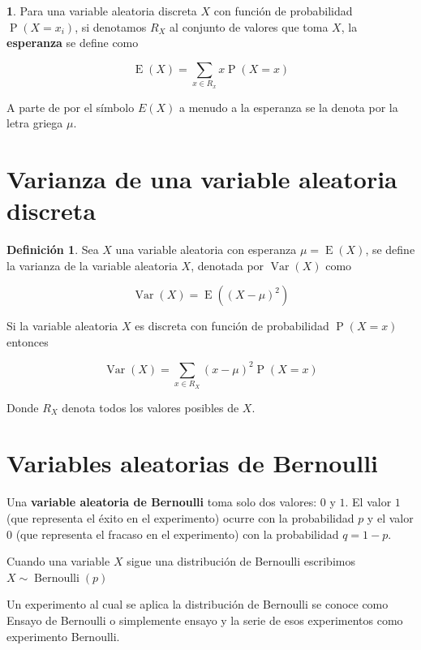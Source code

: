 \documentclass[]{book}
\theoremstyle{plain}
\theoremstyle{definition}
\newtheorem{definition}[theorem]{Definición}
\theoremstyle{definition} %
\newcommand{\thistheoremname}{}
\newtheorem{genericthm}[theorem]{\thistheoremname}
\newenvironment{customdef}[1]
  {\renewcommand{\thistheoremname}{#1}%
   \begin{genericthm}}
  {\end{genericthm}}
\begin{document}
\begin{customdef}{Definición intuitiva de esperanza}
Para una variable aleatoria discreta \(X\) con función de probabilidad
\(\displaystyle \operatorname {P} (X=x_{i})\), si denotamos $R_X$ al conjunto de valores que toma $X$,
 la \textbf{esperanza} se define como

\[\displaystyle \operatorname {E} (X)=\sum _{x \in R_x}x\operatorname {P} (X=x)\]

A parte de por el símbolo $E(X)$ a menudo a la esperanza se la denota por la letra griega $\mu$.

\end{customdef}


\section{Varianza de una variable aleatoria
discreta}
\begin{definition}
  Sea \(X\) una variable aleatoria con esperanza
\(\displaystyle \mu =\operatorname {E} (X)\), se define la varianza de
la variable aleatoria \(X\), denotada por
\(\displaystyle \operatorname {Var} (X)\) como

\[\displaystyle \operatorname {Var} (X)=\operatorname {E} ((X-\mu )^{2})\]

Si la variable aleatoria \(X\) es discreta con función de probabilidad
\(\displaystyle \operatorname {P} (X=x)\) entonces

\[\displaystyle \operatorname {Var} (X)=\sum _{x\in R_{X}}(x-\mu )^{2}\operatorname {P} (X=x)\]

Donde \(R_X\) denota todos los valores posibles de \(X\).
\end{definition}


\hypertarget{variables-aleatorias-de-bernoulli}{%
\section{Variables aleatorias de
Bernoulli}\label{variables-aleatorias-de-bernoulli}}

Una \textbf{variable aleatoria de Bernoulli} toma solo dos valores:
\(0\) y \(1\). El valor \(1\) (que representa el éxito en el
experimento) ocurre con la probabilidad \(p\) y el valor \(0\) (que
representa el fracaso en el experimento) con la probabilidad
\(q = 1 - p\).

Cuando una variable \(X\) sigue una distribución de Bernoulli escribimos
\(\displaystyle X\sim \operatorname {Bernoulli} (p)\)

Un experimento al cual se aplica la distribución de Bernoulli se conoce
como Ensayo de Bernoulli o simplemente ensayo y la serie de esos
experimentos como experimento Bernoulli.
\end{document}
